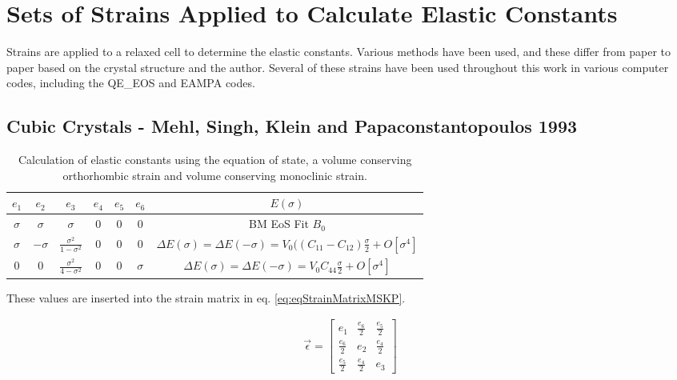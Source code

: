 \FloatBarrier
\section{Sets of Strains Applied to Calculate Elastic Constants}

Strains are applied to a relaxed cell to determine the elastic constants.  Various methods have been used, and these differ from paper to paper based on the crystal structure and the author.  Several of these strains have been used throughout this work in various computer codes, including the QE\_EOS and EAMPA codes.

\subsection{Cubic Crystals - Mehl, Singh, Klein and Papaconstantopoulos 1993}

\renewcommand{\arraystretch}{1.7}
\begin{table}[!htbp]
\centering
\begin{tabular}{c c c c c c c}
\hline\hline
$e_1$ & $e_2$ & $e_3$ & $e_4$ & $e_5$ & $e_6$ & $E(\sigma)$ \\
\hline\hline
$\sigma$ & $\sigma$ & $\sigma$ & 0 & 0 & 0 & BM EoS Fit $B_0$\\
$\sigma$ & $-\sigma$ & $\frac{\sigma^2}{1 - \sigma^2}$ & 0 & 0 & 0 & $\Delta E(\sigma) = \Delta E(-\sigma) = V_{0} ((C_{11} - C_{12}) \frac{\sigma}{2} + O[\sigma^4]$ \\
0 & 0 & $\frac{\sigma^2}{4 - \sigma^2}$ & 0 & 0 & $\sigma$ & $\Delta E(\sigma) = \Delta E(-\sigma) = V_{0} C_{44} \frac{\sigma}{2} + O[\sigma^4]$ \\
\end{tabular}
\label{tab:mskp1993}
\caption{Calculation of elastic constants using the equation of state, a volume conserving orthorhombic strain and volume conserving monoclinic strain.\cite{elasticpropertiesmehl}\cite{mehlsp}}
\end{table}

These values are inserted into the strain matrix in eq. \ref{eq:eqStrainMatrixMSKP}.

\begin{equation}
\begin{split}
\vec{\epsilon} = \begin{bmatrix} e_1 & \frac{e_6}{2} & \frac{e_5}{2} \\ \frac{e_6}{2} & e_2 & \frac{e_4}{2} \\ \frac{e_5}{2} & \frac{e_4}{2} & e_3 \end{bmatrix}
\end{split}
\label{eq:eqStrainMatrixMSKP}
\end{equation}

